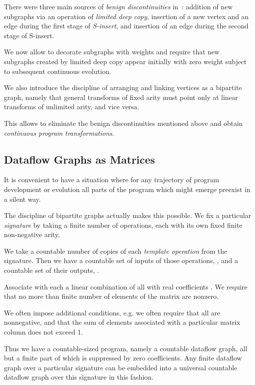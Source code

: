 \documentclass[withtimes]{easychair}
\begin{document}
There were three main sources of {\em benign discontinuities} in~\cite{MBukatinMatthews}:
addition of new subgraphs via an operation of {\em limited deep copy}, insertion of a new vertex and
an edge during the first stage of {\em S-insert}, and insertion of an edge during the second stage of
S-insert.

We now allow to decorate subgraphs with weights and require that new subgraphs created by
limited deep copy appear initially with zero weight subject to subsequent continuous evolution.

We also introduce the discipline of arranging and linking vertices as a bipartite graph, namely
that general transforms of fixed arity must point only at linear transforms of unlimited arity,
and vice versa.

This allows to eliminate the benign discontinuities mentioned above and obtain {\em continuous
program transformations}.

\subsection{Dataflow Graphs as Matrices}

It is convenient to have a situation where for any trajectory of program development or
evolution all parts of the program which might emerge preexist in a silent way.

The discipline of bipartite graphs actually makes this possible. We fix a particular
{\em signature} by taking a finite number of operations, each with its own fixed finite non-negative arity.

We take a countable number of copies of each {\em template operation} from the signature. Then we
have a countable set of inputs of those operations, , and a countable set of their
outputs, .

Associate with each  a linear combination of all  with real coefficients .
We require that no more than finite number of elements of the matrix  are nonzero.

We often impose additional conditions, e.g. we often require that all  are
nonnegative, and that the sum of elements  associated with a particular matrix column 
does not exceed 1.

Thus we have a countable-sized program, namely a countable dataflow graph, all but
a finite part of which is suppressed by zero coefficients. Any finite dataflow graph
over a particular signature can be embedded into a universal countable dataflow graph
over this signature in this fashion.
\end{document}

